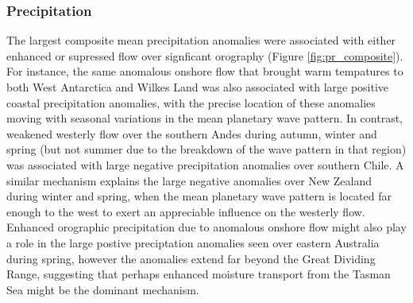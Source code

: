 \subsubsection{Precipitation}

The largest composite mean precipitation anomalies were associated with either enhanced or supressed flow over signficant orography (Figure \ref{fig:pr_composite}). For instance, the same anomalous onshore flow that brought warm tempatures to both West Antarctica and Wilkes Land was also associated with large positive coastal precipitation anomalies, with the precise location of these anomalies moving with seasonal variations in the mean planetary wave pattern. In contrast, weakened westerly flow over the southern Andes during autumn, winter and spring (but not summer due to the breakdown of the wave pattern in that region) was associated with large negative precipitation anomalies over southern Chile. A similar mechanism explains the large negative anomalies over New Zealand during winter and spring, when the mean planetary wave pattern is located far enough to the west to exert an appreciable influence on the westerly flow. Enhanced orographic precipitation due to anomalous onshore flow might also play a role in the large postive preciptation anomalies seen over eastern Australia during spring, however the anomalies extend far beyond the Great Dividing Range, suggesting that perhaps enhanced moisture transport from the Tasman Sea might be the dominant mechanism. 
